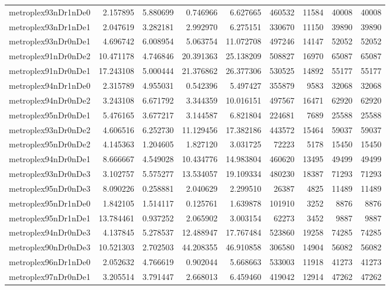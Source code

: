 \begin{longtable}{|l|r|r|r|r|r|r|r|r|}
metroplex93nDr1nDe0 & 2.157895 & 5.880699 & 0.746966 & 6.627665 & 460532 & 11584 & 40008 & 40008 \\
metroplex93nDr1nDe1 & 2.047619 & 3.282181 & 2.992970 & 6.275151 & 330670 & 11150 & 39890 & 39890 \\
metroplex93nDr0nDe1 & 4.696742 & 6.008954 & 5.063754 & 11.072708 & 497246 & 14147 & 52052 & 52052 \\
metroplex91nDr0nDe2 & 10.471178 & 4.746846 & 20.391363 & 25.138209 & 508827 & 16970 & 65087 & 65087 \\
metroplex91nDr0nDe1 & 17.243108 & 5.000444 & 21.376862 & 26.377306 & 530525 & 14892 & 55177 & 55177 \\
metroplex94nDr1nDe0 & 2.315789 & 4.955031 & 0.542396 & 5.497427 & 355879 & 9583 & 32068 & 32068 \\
metroplex94nDr0nDe2 & 3.243108 & 6.671792 & 3.344359 & 10.016151 & 497567 & 16471 & 62920 & 62920 \\
metroplex95nDr0nDe1 & 5.476165 & 3.677217 & 3.144587 & 6.821804 & 224681 & 7689 & 25588 & 25588 \\
metroplex93nDr0nDe2 & 4.606516 & 6.252730 & 11.129456 & 17.382186 & 443572 & 15464 & 59037 & 59037 \\
metroplex95nDr0nDe2 & 4.145363 & 1.204605 & 1.827120 & 3.031725 & 72223 & 5178 & 15450 & 15450 \\
metroplex94nDr0nDe1 & 8.666667 & 4.549028 & 10.434776 & 14.983804 & 460620 & 13495 & 49499 & 49499 \\
metroplex93nDr0nDe3 & 3.102757 & 5.575277 & 13.534057 & 19.109334 & 480230 & 18387 & 71293 & 71293 \\
metroplex95nDr0nDe3 & 8.090226 & 0.258881 & 2.040629 & 2.299510 & 26387 & 4825 & 11489 & 11489 \\
metroplex95nDr1nDe0 & 1.842105 & 1.514117 & 0.125761 & 1.639878 & 101910 & 3252 & 8876 & 8876 \\
metroplex95nDr1nDe1 & 13.784461 & 0.937252 & 2.065902 & 3.003154 & 62273 & 3452 & 9887 & 9887 \\
metroplex94nDr0nDe3 & 4.137845 & 5.278537 & 12.488947 & 17.767484 & 523860 & 19258 & 74285 & 74285 \\
metroplex90nDr0nDe3 & 10.521303 & 2.702503 & 44.208355 & 46.910858 & 306580 & 14904 & 56082 & 56082 \\
metroplex96nDr1nDe0 & 2.052632 & 4.766619 & 0.902044 & 5.668663 & 533003 & 11918 & 41273 & 41273 \\
metroplex97nDr0nDe1 & 3.205514 & 3.791447 & 2.668013 & 6.459460 & 419042 & 12914 & 47262 & 47262 \\

\end{longtable}
